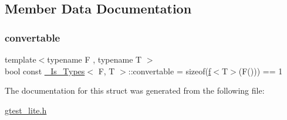 \subsection{Member Data Documentation}
\mbox{\label{struct___is___types_aef853f15f013611d0890cb6fc408ae47}} 
\subsubsection{\texorpdfstring{convertable}{convertable}}
{\footnotesize\ttfamily template$<$typename F , typename T $>$ \\
bool const \hyperlink{struct___is___types}{\+\_\+\+Is\+\_\+\+Types}$<$ F, T $>$\+::convertable = sizeof(\hyperlink{struct___is___types_a56e08a2768c571caab81e9bc47d5acc6}{f}$<$T$>$(F())) == 1\hspace{0.3cm}{\ttfamily [static]}}



The documentation for this struct was generated from the following file\+:\begin{DoxyCompactItemize}
\item 
\hyperlink{gtest__lite_8h}{gtest\+\_\+lite.\+h}\end{DoxyCompactItemize}
